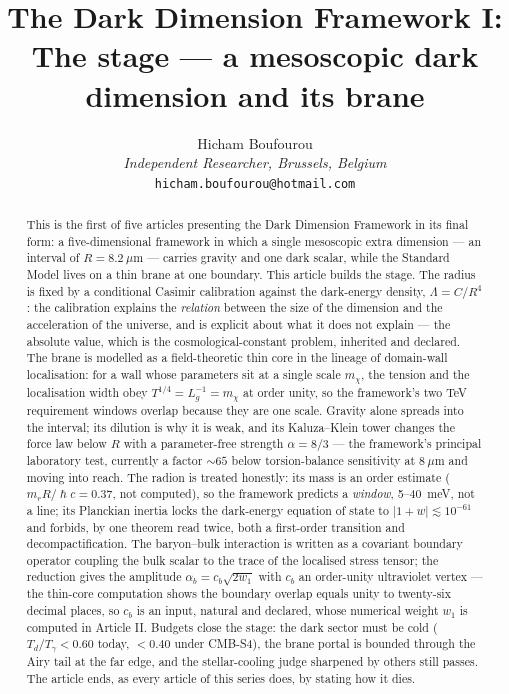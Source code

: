 
\graphicspath{{figures/}{../figures/}}
\title{\textbf{The Dark Dimension Framework I:\\ The stage --- a mesoscopic dark dimension and its brane}}
\author{Hicham Boufourou\\ \small\textit{Independent Researcher, Brussels, Belgium}\\ \small\texttt{hicham.boufourou@hotmail.com}}
\maketitle
\begin{abstract}
\noindent This is the first of five articles presenting the Dark Dimension Framework in its final form: a five-dimensional framework in which a single mesoscopic extra dimension --- an interval of $R=8.2~\mu$m --- carries gravity and one dark scalar, while the Standard Model lives on a thin brane at one boundary. This article builds the stage. The radius is fixed by a conditional Casimir calibration against the dark-energy density, $\Lambda=C/R^{4}$: the calibration explains the \emph{relation} between the size of the dimension and the acceleration of the universe, and is explicit about what it does not explain --- the absolute value, which is the cosmological-constant problem, inherited and declared. The brane is modelled as a field-theoretic thin core in the lineage of domain-wall localisation: for a wall whose parameters sit at a single scale $m_\chi$, the tension and the localisation width obey $T^{1/4}=L_{g}^{-1}=m_\chi$ at order unity, so the framework's two TeV requirement windows overlap because they are one scale. Gravity alone spreads into the interval; its dilution is why it is weak, and its Kaluza--Klein tower changes the force law below $R$ with a parameter-free strength $\alpha=8/3$ --- the framework's principal laboratory test, currently a factor $\sim65$ below torsion-balance sensitivity at $8~\mu$m and moving into reach. The radion is treated honestly: its mass is an order estimate ($m_{r}R/\hslash c=0.37$, not computed), so the framework predicts a \emph{window}, 5--40~meV, not a line; its Planckian inertia locks the dark-energy equation of state to $|1+w|\lesssim10^{-61}$ and forbids, by one theorem read twice, both a first-order transition and decompactification. The baryon--bulk interaction is written as a covariant boundary operator coupling the bulk scalar to the trace of the localised stress tensor; the reduction gives the amplitude $\alpha_{b}=c_{b}\sqrt{2w_{1}}$ with $c_{b}$ an order-unity ultraviolet vertex --- the thin-core computation shows the boundary overlap equals unity to twenty-six decimal places, so $c_{b}$ is an input, natural and declared, whose numerical weight $w_{1}$ is computed in Article II. Budgets close the stage: the dark sector must be cold ($T_{d}/T_{\gamma}<0.60$ today, $<0.40$ under CMB-S4), the brane portal is bounded through the Airy tail at the far edge, and the stellar-cooling judge sharpened by others still passes. The article ends, as every article of this series does, by stating how it dies.
\end{abstract}

